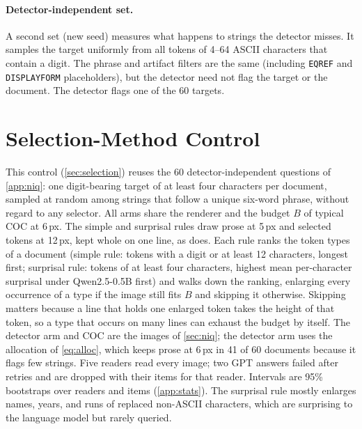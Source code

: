 \paragraph{Detector-independent set.}
A second set (new seed) measures what happens to strings the detector misses.
It samples the target uniformly from all tokens of 4--64 ASCII characters that contain a digit.
The phrase and artifact filters are the same (including \texttt{EQREF} and \texttt{DISPLAYFORM} placeholders), but the detector need not flag the target or the document.
The detector flags one of the 60 targets.

\section{Selection-Method Control}
\label{app:selection}

This control (\cref{sec:selection}) reuses the 60 detector-independent questions of \cref{app:niq}: one digit-bearing target of at least four characters per document, sampled at random among strings that follow a unique six-word phrase, without regard to any selector.
All arms share the renderer and the budget $B$ of typical COC at 6\,px.
The simple and surprisal rules draw prose at 5\,px and selected tokens at 12\,px, kept whole on one line, as \name does.
Each rule ranks the token types of a document (simple rule: tokens with a digit or at least 12 characters, longest first; surprisal rule: tokens of at least four characters, highest mean per-character surprisal under Qwen2.5-0.5B first) and walks down the ranking, enlarging every occurrence of a type if the image still fits $B$ and skipping it otherwise.
Skipping matters because a line that holds one enlarged token takes the height of that token, so a type that occurs on many lines can exhaust the budget by itself.
The detector arm and COC are the images of \cref{sec:niq}; the detector arm uses the allocation of \cref{eq:alloc}, which keeps prose at 6\,px in 41 of 60 documents because it flags few strings.
Five readers read every image; two GPT answers failed after retries and are dropped with their items for that reader.
Intervals are 95\% bootstraps over readers and items (\cref{app:stats}).
The surprisal rule mostly enlarges names, years, and runs of replaced non-ASCII characters, which are surprising to the language model but rarely queried.

